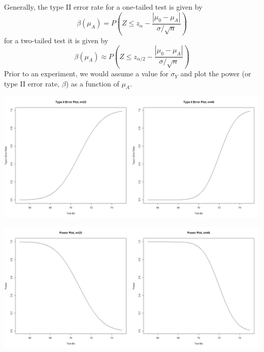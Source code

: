 Generally, the type II error rate for a one-tailed test is given by
$$\beta(\mu_A)=P\left(Z\leq z_\alpha - \frac{|\mu_0-\mu_A|}{\sigma/\sqrt{n}}\right)$$
for a two-tailed test it is given by
$$\beta(\mu_A)\approx P\left(Z\leq z_{\alpha/2} - \frac{|\mu_0-\mu_A|}{\sigma/\sqrt{n}}\right)$$
Prior to an experiment, we would assume a value for $\sigma_Y$ and plot the power (or type II error rate, $\beta$) as a function of $\mu_A$.  
\begin{flushleft}
\includegraphics[scale=0.3]{typeIIerrorplot}
\end{flushleft}
\begin{flushleft}
\includegraphics[scale=0.3]{powerplot}
\end{flushleft}

